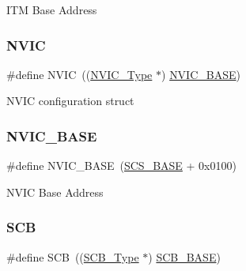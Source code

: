 I\+TM Base Address ~\newline
 \mbox{\label{group___c_m_s_i_s___c_m3__core__register_gac8e97e8ce56ae9f57da1363a937f8a17}} 
\subsubsection{\texorpdfstring{NVIC}{NVIC}}
{\footnotesize\ttfamily \#define N\+V\+IC~((\mbox{\hyperlink{struct_n_v_i_c___type}{N\+V\+I\+C\+\_\+\+Type}} $\ast$)          \mbox{\hyperlink{group___c_m_s_i_s___c_m3__core__register_gaa0288691785a5f868238e0468b39523d}{N\+V\+I\+C\+\_\+\+B\+A\+SE}})}

N\+V\+IC configuration struct ~\newline
 \mbox{\label{group___c_m_s_i_s___c_m3__core__register_gaa0288691785a5f868238e0468b39523d}} 
\subsubsection{\texorpdfstring{NVIC\_BASE}{NVIC\_BASE}}
{\footnotesize\ttfamily \#define N\+V\+I\+C\+\_\+\+B\+A\+SE~(\mbox{\hyperlink{group___c_m_s_i_s___c_m3__core__register_ga3c14ed93192c8d9143322bbf77ebf770}{S\+C\+S\+\_\+\+B\+A\+SE}} +  0x0100)}

N\+V\+IC Base Address ~\newline
 \mbox{\label{group___c_m_s_i_s___c_m3__core__register_gaaaf6477c2bde2f00f99e3c2fd1060b01}} 
\subsubsection{\texorpdfstring{SCB}{SCB}}
{\footnotesize\ttfamily \#define S\+CB~((\mbox{\hyperlink{struct_s_c_b___type}{S\+C\+B\+\_\+\+Type}} $\ast$)           \mbox{\hyperlink{group___c_m_s_i_s___c_m3__core__register_gad55a7ddb8d4b2398b0c1cfec76c0d9fd}{S\+C\+B\+\_\+\+B\+A\+SE}})}

